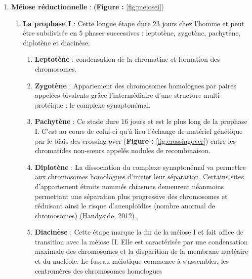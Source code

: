 \documentclass[12pt,twoside]{reedthesis}
\providecommand{\tightlist}{%
  \setlength{\itemsep}{0pt}\setlength{\parskip}{0pt}}
\theoremstyle{definition}
\theoremstyle{definition}
\theoremstyle{remark}
\begin{document}
  \begin{enumerate}
  \def\labelenumi{\arabic{enumi}.}
  \tightlist
  \item
    \textbf{Méiose réductionnelle} : (\textbf{Figure : }\ref{fig:meiosei})
  
    \begin{enumerate}
    \def\labelenumii{\alph{enumii}.}
    \tightlist
    \item
      \textbf{La prophase I} : Cette longue étape dure 23 jours chez
      l'homme et peut être subdivisée en 5 phases successives : leptotène,
      zygotène, pachytène, diplotène et diacinèse.
  
      \begin{enumerate}
      \def\labelenumiii{\roman{enumiii}.}
      \tightlist
      \item
        \textbf{Leptotène} : condensation de la chromatine et formation
        des chromosomes.\\
      \item
        \textbf{Zygotène} : Appariement des chromosomes homologues par
        paires appelées bivalents grâce l'intermédiaire d'une structure
        multi-protéique : le complexe synaptonémal.\\
      \item
        \textbf{Pachytène} : Ce stade dure 16 jours et est le plus long de
        la prophase I. C'est au cours de celui-ci qu'à lieu l'échange de
        matériel génétique par le biais des crossing-over (\textbf{Figure
        : }\ref{fig:crossingover}) entre les chromatides non-sœurs appelés
        nodules de recombinaison.\\
      \item
        \textbf{Diplotène} : La dissociation du complexe synaptonémal va
        permettre aux chromosomes homologues d'initier leur séparation.
        Certains sites d'appariement étroits nommés chiasmas demeurent
        néanmoins permettant une séparation plus progressive des
        chromosomes et réduisant ainsi le risque d'aneuploïdies (nombre
        anormal de chromosomes) (Handyside, 2012).\\
      \item
        \textbf{Diacinèse} : Cette étape marque la fin de la méiose I et
        fait office de transition avec la méiose II. Elle est caractérisée
        par une condensation maximale des chromosomes et la disparition de
        la membrane nucléaire et du nucléole. Le fuseau méiotique commence
        à s'assembler, les centromères des chromosomes homologues

\end{enumerate}
\end{enumerate}
\end{enumerate}
\end{document}
